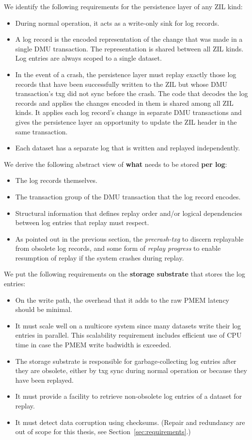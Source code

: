 \documentclass[12pt,a4paper,twoside]{book}
\begin{document}
We identify the following requirements for the persistence layer of any ZIL kind:
\begin{itemize}[noitemsep]
\item During normal operation, it acts as a write-only sink for log records.
\item A log record is the encoded representation of the change that was made in a single DMU transaction.
    The representation is shared between all ZIL kinds.
    Log entries are always scoped to a single dataset.
\item In the event of a crash, the persistence layer must replay exactly those log records that have been successfully written to the ZIL but whose DMU transaction's txg did not sync before the crash.
    The code that decodes the log records and applies the changes encoded in them is shared among all ZIL kinds.
    It applies each log record's change in separate DMU transactions and gives the persistence layer an opportunity to update the ZIL header in the same transaction.
\item Each dataset has a separate log that is written and replayed independently.
\end{itemize}
We derive the following abstract view of \textbf{what} needs to be stored \textbf{per log}:
\begin{itemize}
    \item The log records themselves.
    \item The transaction group of the DMU transaction that the log record encodes.
    \item Structural information that defines replay order and/or logical dependencies between log entries that replay must respect.
    \item As pointed out in the previous section, the \textit{precrash-txg} to discern replayable from obsolete log records, and some form of \textit{replay progress} to enable resumption of replay if the system crashes during replay.
\end{itemize}
We put the following requirements on the \textbf{storage substrate} that stores the log entries:
\begin{itemize}
    \item On the write path, the overhead that it adds to the raw PMEM latency should be minimal.
    \item It must scale well on a multicore system since many datasets write their log entries in parallel.
        This scalability requirement includes efficient use of CPU time in case the PMEM write badwidth is exceeded.
    \item The storage substrate is responsible for garbage-collecting log entries after they are obsolete, either by txg sync during normal operation or because they have been replayed.
    \item It must provide a facility to retrieve non-obsolete log entries of a dataset for replay.
    \item It must detect data corruption using checksums. (Repair and redundancy are out of scope for this thesis, see Section~\ref{sec:requirements}.)
\end{itemize}
\end{document}
